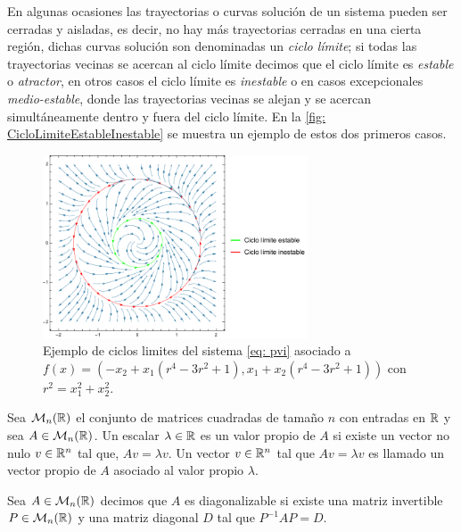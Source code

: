En algunas ocasiones las trayectorias o curvas solución de un sistema pueden ser cerradas y aisladas, es decir, no hay más trayectorias cerradas en una cierta región, dichas curvas solución son denominadas un \textit{ciclo límite}; si todas las trayectorias vecinas se acercan al ciclo límite decimos que el ciclo límite es \textit{estable} o \textit{atractor}, en otros casos el ciclo límite es \textit{inestable} o en casos excepcionales \textit{medio-estable}, donde las trayectorias vecinas se alejan y se acercan simultáneamente dentro y fuera del ciclo límite. En la \autoref{fig: CicloLimiteEstableInestable} se muestra un ejemplo de estos dos primeros casos.

\begin{figure}
	\centering
	\includegraphics[width=0.7\textwidth]{img/CicloLimEstInest.pdf}
	\caption{Ejemplo de ciclos limites del sistema \eqref{eq: pvi} asociado a $f(x) = (-x_{2} + x_{1}(r^{4} -3r^{2} + 1), x_{1} + x_{2}(r^{4} -3r^{2} + 1))$ con $r^{2} = x_{1}^{2} + x_{2}^{2}$.}
	\label{fig: CicloLimiteEstableInestable}
\end{figure}

\begin{defi}
	Sea $\mathcal{M}_{n}({\mathbb{R}})$ el conjunto de matrices cuadradas de tamaño $n$ con entradas en ${\mathbb{R}}$ y sea $A \in \mathcal{M}_{n}({\mathbb{R}})$. Un escalar $\lambda \in {\mathbb{R}}$ es un valor propio de $A$ si existe un vector no nulo $v \in {\mathbb{R}}^{n}$ tal que, $Av = \lambda v$. Un vector $v \in {\mathbb{R}}^{n}$ tal que $Av = \lambda v$ es llamado un vector propio de $A$ asociado al valor propio $\lambda$.
\end{defi}

\begin{defi}
	Sea $A \in \mathcal{M}_{n}({\mathbb{R}})$ decimos que $A$ es diagonalizable si existe una matriz invertible $P \in \mathcal{M}_{n}({\mathbb{R}})$ y una matriz diagonal $D$ tal que $P^{-1}AP = D$.
\end{defi}

